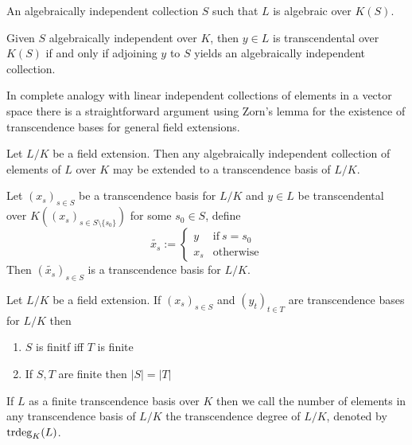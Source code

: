 \begin{definition}
   An algebraically independent collection \(S\) such that \(L\) is algebraic over \(K(S)\).
\end{definition}
\begin{remark}
   Given \(S\) algebraically independent over \(K\), then \(y \in L\) is transcendental over \(K(S)\) if and only if adjoining \(y\) to \(S\) yields an algebraically independent collection.
\end{remark}
In complete analogy with linear independent collections of elements in a vector space there is a straightforward argument using Zorn's lemma for the existence of transcendence bases for general field extensions.
\begin{proposition}
   Let \(L/K\) be a field extension.
   Then any algebraically independent collection of elements of \(L\) over \(K\) may be extended to a transcendence basis of \(L/K\).
\end{proposition}

\begin{lemma}
   Let \((x_s)_{s \in S}\) be a transcendence basis for \(L/K\) and \(y \in L\) be transcendental over \(K((x_s)_{s \in S\setminus\{s_0\}})\) for some \(s_0 \in S\), define
   \[\tilde{x_s} := \begin{cases}y & \text{if}~s = s_0\\x_s & \text{otherwise}\end{cases}\]
   Then \((\tilde{x_s})_{s \in S}\) is a transcendence basis for \(L/K\).
\end{lemma}

\begin{proposition}
   Let \(L/K\) be a field extension.
   If \((x_s)_{s \in S}\) and \((y_t)_{t \in T}\) are transcendence bases for \(L/K\) then
   \begin{enumerate}[label=\roman*, align=Center]
      \item \(S\) is finitf iff \(T\) is finite
      \item If \(S, T\) are finite then \(|S| = |T|\)
   \end{enumerate}
\end{proposition}

\begin{definition}
   If \(L\) as a finite transcendence basis over \(K\) then we call the number of elements in any transcendence basis of \(L/K\) the transcendence degree of \(L/K\), denoted by \(\operatorname{trdeg}_K(L)\).
\end{definition}

